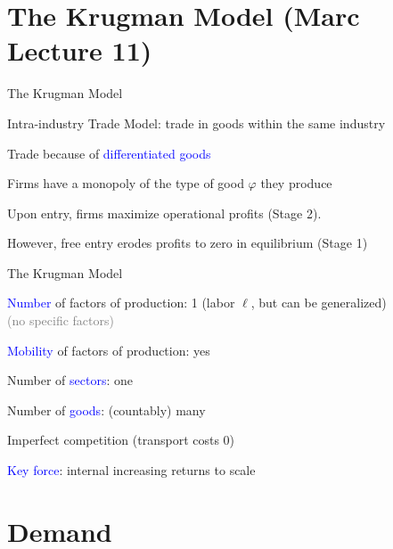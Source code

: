 \documentclass[notes,11pt, aspectratio=169, xcolor=table]{beamer}
\newcommand{\blue}[1]{\textcolor{blue}{#1}}
\newenvironment{wideitemize}{\itemize\addtolength{\itemsep}{10pt}}{\enditemize}
\begin{document}
\section{The Krugman Model (Marc Lecture 11)}

\begin{frame}{The Krugman Model}

\begin{wideitemize}
    \item Intra-industry Trade Model: trade in goods within the same industry
    \item Trade because of \blue{differentiated goods}
    \item Firms have a monopoly of the type of good $\varphi$ they produce
    \item Upon entry, firms maximize operational profits (Stage 2).
    \item  However, free entry erodes profits to zero in equilibrium (Stage 1)
\end{wideitemize}
    
\end{frame}

\begin{frame}{The Krugman Model}
    \begin{wideitemize}
        \item \blue{Number} of factors of production: 1 (labor $\ell$, but can be generalized)\\
        \qquad \textcolor{gray}{(no specific factors)}
        
    \item<2-> \blue{Mobility} of factors of production: yes
    
    \item<3-> Number of \blue{sectors}: one 

    \item<4-> Number of \blue{goods}: (countably) many
    

    \item<5-> Imperfect competition (transport costs 0)

    \item<5-> \blue{Key force}: internal increasing returns to scale
    \end{wideitemize}    
\end{frame}

\section{Demand}
\end{document}
